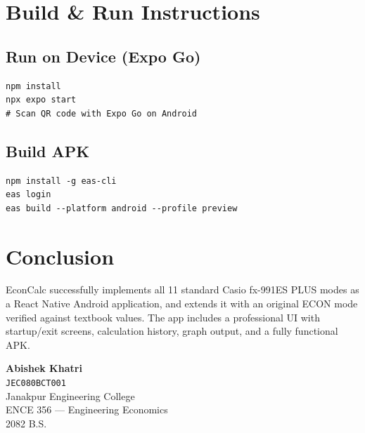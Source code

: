 \documentclass[12pt]{article}
\begin{document}
\section{Build \& Run Instructions}

\subsection{Run on Device (Expo Go)}
\begin{verbatim}
npm install
npx expo start
# Scan QR code with Expo Go on Android
\end{verbatim}

\subsection{Build APK}
\begin{verbatim}
npm install -g eas-cli
eas login
eas build --platform android --profile preview
\end{verbatim}

\section{Conclusion}

EconCalc successfully implements all 11 standard Casio fx-991ES PLUS modes as a React Native
Android application, and extends it with an original ECON mode verified against textbook
values. The app includes a professional UI with startup/exit screens, calculation history,
graph output, and a fully functional APK.

\vspace{1.5em}
\begin{center}
\begin{tcolorbox}[width=0.65\textwidth,colback=orange!8,colframe=casio,
    center title,title=Submitted By]
\centering
\textbf{Abishek Khatri}\\
\texttt{JEC080BCT001}\\
Janakpur Engineering College\\
ENCE 356 --- Engineering Economics\\
2082 B.S.
\end{tcolorbox}
\end{center}
\end{document}
